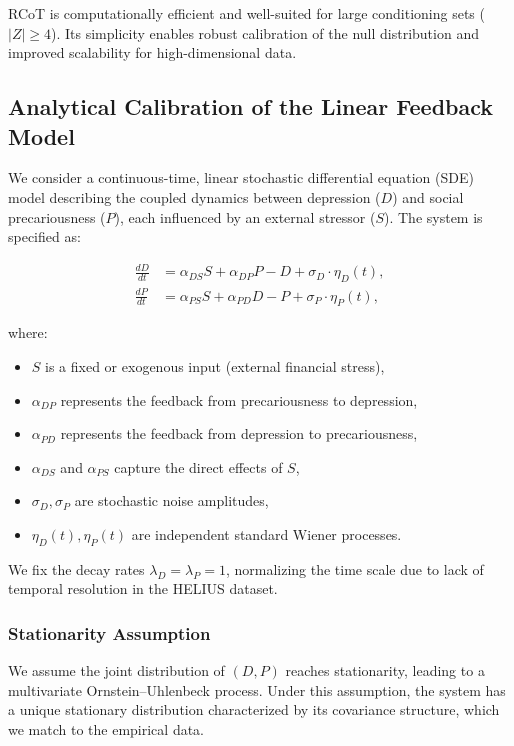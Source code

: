 \documentclass[
]{article}
\providecommand{\tightlist}{%
  \setlength{\itemsep}{0pt}\setlength{\parskip}{0pt}}\usepackage{longtable,booktabs,array}
\begin{document}
RCoT is computationally efficient and well-suited for large conditioning
sets (\(|Z| \geq 4\)). Its simplicity enables robust calibration of the
null distribution and improved scalability for high-dimensional data.

\subsection{Analytical Calibration of the Linear Feedback
Model}\label{sec-analcalibration}

We consider a continuous-time, linear stochastic differential equation
(SDE) model describing the coupled dynamics between depression (\(D\))
and social precariousness (\(P\)), each influenced by an external
stressor (\(S\)). The system is specified as:

\[
\begin{aligned}
\frac{dD}{dt} &= \alpha_{DS} S + \alpha_{DP} P - D + \sigma_D \cdot \eta_D(t), \\
\frac{dP}{dt} &= \alpha_{PS} S + \alpha_{PD} D - P + \sigma_P \cdot \eta_P(t),
\end{aligned}
\]

where:

\begin{itemize}
\tightlist
\item
  \(S\) is a fixed or exogenous input (external financial stress),
\item
  \(\alpha_{DP}\) represents the feedback from precariousness to
  depression,
\item
  \(\alpha_{PD}\) represents the feedback from depression to
  precariousness,
\item
  \(\alpha_{DS}\) and \(\alpha_{PS}\) capture the direct effects of
  \(S\),
\item
  \(\sigma_D, \sigma_P\) are stochastic noise amplitudes,
\item
  \(\eta_D(t), \eta_P(t)\) are independent standard Wiener processes.
\end{itemize}

We fix the decay rates \(\lambda_D = \lambda_P = 1\), normalizing the
time scale due to lack of temporal resolution in the HELIUS dataset.

\subsubsection{Stationarity Assumption}\label{stationarity-assumption}

We assume the joint distribution of \((D, P)\) reaches stationarity,
leading to a multivariate Ornstein--Uhlenbeck process. Under this
assumption, the system has a unique stationary distribution
characterized by its covariance structure, which we match to the
empirical data.
\end{document}
